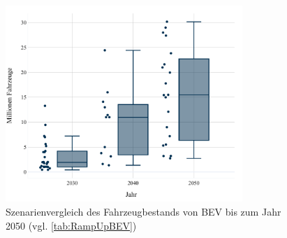 \begin{figure}[H]
    \centering
    \includegraphics[width=0.8\textwidth]{Bilder/RampUp-BEV-MA}
    \caption[Szenarienvergleich des Fahrzeugbestands von BEV bis zum Jahr \num{2050}]{Szenarienvergleich des Fahrzeugbestands von BEV bis zum Jahr \num{2050} (vgl. \autoref{tab:RampUpBEV})}\label{fig:RampUpBEV}
\end{figure}